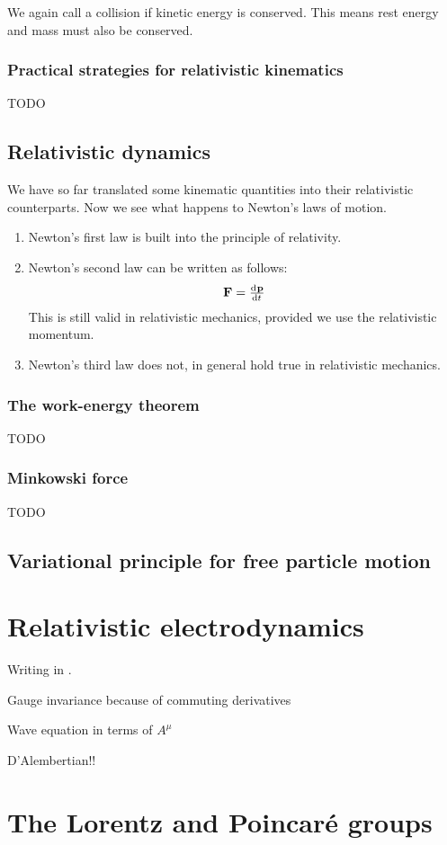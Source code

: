 We again call a collision  if kinetic energy is conserved. This means rest energy and mass must also be conserved.

\subsection{Practical strategies for relativistic kinematics}
TODO

\section{Relativistic dynamics}
We have so far translated some kinematic quantities into their relativistic counterparts. Now we see what happens to Newton's laws of motion.
\begin{enumerate}
\item Newton's first law is built into the principle of relativity.
\item Newton's second law can be written as follows:
\[ \vec{F} = \od{\vec{p}}{t} \]
This is still valid in relativistic mechanics, provided we use the relativistic momentum.
\item Newton's third law does not, in general hold true in relativistic mechanics.
\end{enumerate}
\subsection{The work-energy theorem}
TODO
\subsection{Minkowski force}
TODO

\section{Variational principle for free particle motion}

\chapter{Relativistic electrodynamics}
Writing in .

Gauge invariance because of commuting derivatives

Wave equation in terms of $A^\mu$

D'Alembertian!!

\chapter{The Lorentz and Poincaré groups}

